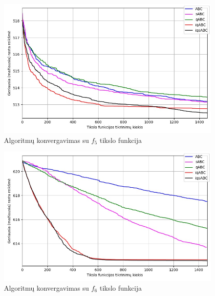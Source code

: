 \documentclass{VUMIFKompMagistrinis}
\begin{document}
\begin{landscape}
\begin{multicols}{2}
\begin{figure}[H]
    \centering
    \includegraphics[scale=0.45]{img/2kv/all_f5.jpg}
    \caption{Algoritmų konvergavimas su $f_{5}$ tikslo funkcija}
    \label{img:konf5}
\end{figure}

\begin{figure}[H]
    \centering
    \includegraphics[scale=0.45]{img/2kv/all_f6.jpg}
    \caption{Algoritmų konvergavimas su $f_{6}$ tikslo funkcija}
    \label{img:konf6}
\end{figure}





\end{multicols}\newpage
\begin{multicols}{2}


\end{multicols}
\end{landscape}
\end{document}
